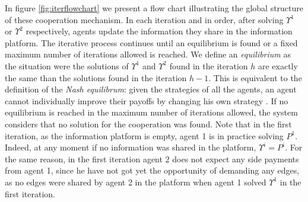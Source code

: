 \documentclass{article}
\begin{document}
In figure \ref{fig:iterflowchart} we present a flow chart illustrating the global structure of these cooperation mechanism.
In each iteration and in order, after solving $\Upsilon^1$ or $\Upsilon^2$ respectively, agents update the information they share in the information platform. The iterative process continues until an equilibrium is found or a fixed maximum number of iterations allowed is reached. We define an \emph{equilibrium} as the situation were the solutions of $\Upsilon^1$ and $\Upsilon^2$ found in the iteration $h$ are exactly the same than the solutions found in the iteration $h-1$. This is equivalent to the definition of the \emph{Nash equilibrum}: given the strategies of all the agents, an agent cannot individually improve their payoffs by changing his own strategy \parencite{GONZALEZ2010}. If no equilibrium is reached in the maximum number of iterations allowed, the system considers that no solution for the cooperation was found. Note that in the first iteration, as the information platform is empty, agent 1 is in practice solving $P^1$. Indeed, at any moment if no information was shared in the platform, $\Upsilon^i=P^i$. For the same reason, in the first iteration agent 2 does not expect any side payments from agent 1, since he have not got yet the opportunity of demanding any edges, as no edges were shared by agent 2 in the platform when agent 1 solved $\Upsilon^1$ in the first iteration. 
\end{document}
